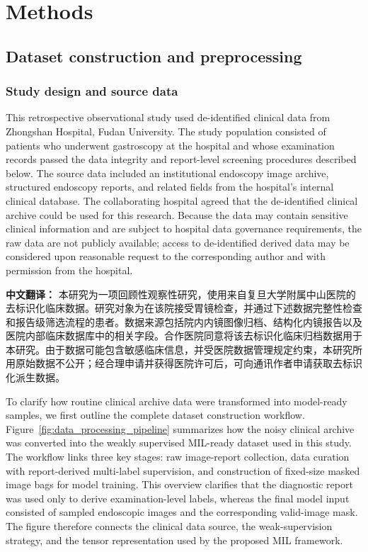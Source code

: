 \documentclass[Afour,sagev,times]{sagej}
\begin{document}
\section{Methods}
\subsection{Dataset construction and preprocessing}
\subsubsection{Study design and source data}
This retrospective observational study used de-identified clinical data from Zhongshan Hospital, Fudan University. The study population consisted of patients who underwent gastroscopy at the hospital and whose examination records passed the data integrity and report-level screening procedures described below. The source data included an institutional endoscopy image archive, structured endoscopy reports, and related fields from the hospital's internal clinical database. The collaborating hospital agreed that the de-identified clinical archive could be used for this research. Because the data may contain sensitive clinical information and are subject to hospital data governance requirements, the raw data are not publicly available; access to de-identified derived data may be considered upon reasonable request to the corresponding author and with permission from the hospital.

\textbf{中文翻译：} 本研究为一项回顾性观察性研究，使用来自复旦大学附属中山医院的去标识化临床数据。研究对象为在该院接受胃镜检查，并通过下述数据完整性检查和报告级筛选流程的患者。数据来源包括院内内镜图像归档、结构化内镜报告以及医院内部临床数据库中的相关字段。合作医院同意将该去标识化临床归档数据用于本研究。由于数据可能包含敏感临床信息，并受医院数据管理规定约束，本研究所用原始数据不公开；经合理申请并获得医院许可后，可向通讯作者申请获取去标识化派生数据。

To clarify how routine clinical archive data were transformed into model-ready samples, we first outline the complete dataset construction workflow. Figure~\ref{fig:data_processing_pipeline} summarizes how the noisy clinical archive was converted into the weakly supervised MIL-ready dataset used in this study. The workflow links three key stages: raw image-report collection, data curation with report-derived multi-label supervision, and construction of fixed-size masked image bags for model training. This overview clarifies that the diagnostic report was used only to derive examination-level labels, whereas the final model input consisted of sampled endoscopic images and the corresponding valid-image mask. The figure therefore connects the clinical data source, the weak-supervision strategy, and the tensor representation used by the proposed MIL framework.
\end{document}
